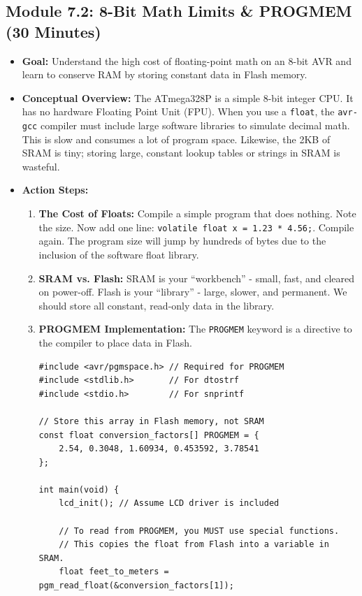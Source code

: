 \documentclass[11pt,a4paper]{article}
\begin{document}
\subsection*{Module 7.2: 8-Bit Math Limits \& PROGMEM (30 Minutes)}

\begin{itemize}
    \item \textbf{Goal:} Understand the high cost of floating-point math on an 8-bit AVR and learn to conserve RAM by storing constant data in Flash memory.
    \item \textbf{Conceptual Overview:} The ATmega328P is a simple 8-bit integer CPU. It has no hardware Floating Point Unit (FPU). When you use a \verb|float|, the \verb|avr-gcc| compiler must include large software libraries to simulate decimal math. This is slow and consumes a lot of program space. Likewise, the 2KB of SRAM is tiny; storing large, constant lookup tables or strings in SRAM is wasteful.
    \item \textbf{Action Steps:}
    \begin{enumerate}
        \item \textbf{The Cost of Floats:} Compile a simple program that does nothing. Note the size. Now add one line: \verb|volatile float x = 1.23 * 4.56;|. Compile again. The program size will jump by hundreds of bytes due to the inclusion of the software float library.
        \item \textbf{SRAM vs. Flash:} SRAM is your ``workbench'' - small, fast, and cleared on power-off. Flash is your ``library'' - large, slower, and permanent. We should store all constant, read-only data in the library.
        \item \textbf{PROGMEM Implementation:} The \verb|PROGMEM| keyword is a directive to the compiler to place data in Flash.
\begin{lstlisting}[caption={Code for Module 7.2: Using PROGMEM}]
#include <avr/pgmspace.h> // Required for PROGMEM
#include <stdlib.h>       // For dtostrf
#include <stdio.h>        // For snprintf

// Store this array in Flash memory, not SRAM
const float conversion_factors[] PROGMEM = {
    2.54, 0.3048, 1.60934, 0.453592, 3.78541
};

int main(void) {
    lcd_init(); // Assume LCD driver is included

    // To read from PROGMEM, you MUST use special functions.
    // This copies the float from Flash into a variable in SRAM.
    float feet_to_meters = pgm_read_float(&conversion_factors[1]);


\end{lstlisting}
\end{enumerate}
\end{itemize}
\end{document}
